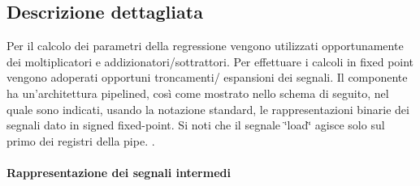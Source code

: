 \subsection{Descrizione dettagliata}
Per il calcolo dei parametri della regressione vengono utilizzati opportunamente dei moltiplicatori e addizionatori/sottrattori. Per effettuare i calcoli in fixed point vengono adoperati opportuni troncamenti/ espansioni dei segnali. Il componente ha un'architettura pipelined, così come mostrato nello schema di seguito, nel quale sono indicati, usando la notazione standard, le rappresentazioni binarie dei segnali dato in signed fixed-\/point. Si noti che il segnale \char`\"{}load\char`\"{} agisce solo sul primo dei registri della pipe. . 

\paragraph*{Rappresentazione dei segnali intermedi}

